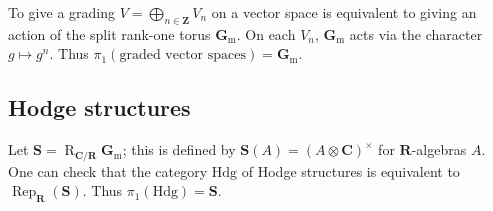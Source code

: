 \documentclass{article}
\DeclareMathOperator{\rep}{Rep}
\DeclareMathOperator{\weil}{R}
\newcommand{\dC}{\mathbf{C}}
\newcommand{\dR}{\mathbf{R}}
\newcommand{\dS}{\mathbf{S}}
\newcommand{\dZ}{\mathbf{Z}}
\newcommand{\Gm}{\mathbf{G}_\mathrm{m}}
\newcommand{\hodge}{\mathrm{Hdg}}
\begin{document}
To give a grading $V=\bigoplus_{n\in \dZ} V_n$ on a vector space is equivalent 
to giving an action of the split rank-one torus $\Gm$. On each $V_n$, $\Gm$ 
acts via the character $g\mapsto g^n$. Thus 
$\pi_1(\text{graded vector spaces})=\Gm$. 


\subsection{Hodge structures}

Let $\dS=\weil_{\dC/\dR}\Gm$; this is defined by $\dS(A)=(A\otimes\dC)^\times$ 
for $\dR$-algebras $A$. One can check that the category $\hodge$ of Hodge 
structures is equivalent to $\rep_\dR(\dS)$. Thus $\pi_1(\hodge)=\dS$. 





\printbibliography
\end{document}
